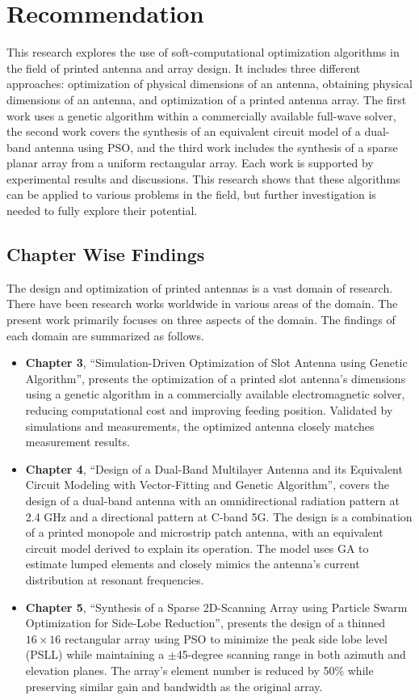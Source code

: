 \documentclass[]{ectguthesis}
\begin{document}
\chapter*{Recommendation}
This research explores the use of soft-computational optimization algorithms in the field of printed antenna and array design. It includes three different approaches: optimization of physical dimensions of an antenna, obtaining physical dimensions of an antenna, and optimization of a printed antenna array. The first work uses a genetic algorithm within a commercially available full-wave solver, the second work covers the synthesis of an equivalent circuit model of a dual-band antenna using PSO, and the third work includes the synthesis of a sparse planar array from a uniform rectangular array. Each work is supported by experimental results and discussions. This research shows that these algorithms can be applied to various problems in the field, but further investigation is needed to fully explore their potential.

\section{Chapter Wise Findings}\label{c6sec_findings}
The design and optimization of printed antennas is a vast domain of research. There have been research works worldwide in various areas of the domain. The present work primarily focuses on three  aspects of the domain. The findings of each domain are summarized as follows.
\begin{itemize}
\item \textbf{Chapter 3}, ``Simulation-Driven Optimization of Slot Antenna using Genetic Algorithm'', presents the optimization of a printed slot antenna's dimensions using a genetic algorithm in a commercially available electromagnetic solver, reducing computational cost and improving feeding position. Validated by simulations and measurements, the optimized antenna closely matches measurement results.

\item \textbf{Chapter 4}, ``Design of a Dual-Band Multilayer Antenna and its Equivalent Circuit Modeling with Vector-Fitting and Genetic Algorithm'', covers the design of a dual-band antenna with an omnidirectional radiation pattern at 2.4 GHz and a directional pattern at C-band 5G. The design is a combination of a printed monopole and microstrip patch antenna, with an equivalent circuit model derived to explain its operation. The model uses GA to estimate lumped elements and closely mimics the antenna's current distribution at resonant frequencies.

\item \textbf{Chapter 5}, ``Synthesis of a Sparse 2D-Scanning Array using Particle Swarm Optimization for Side-Lobe Reduction'', presents the design of a thinned $16\times16$ rectangular array using PSO to minimize the peak side lobe level (PSLL) while maintaining a $\pm$45-degree scanning range in both azimuth and elevation planes. The array's element number is reduced by 50\% while preserving similar gain and bandwidth as the original array.
\end{itemize}
\end{document}
